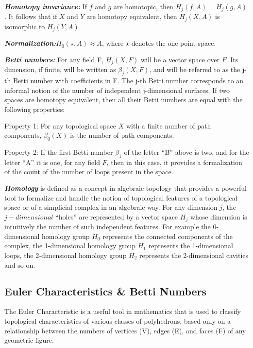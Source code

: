 \textbf{\textit{Homotopy invariance:}} If $f$ and $g$ are homotopic, then $H_j(f,A)=H_j(g,A)$. It follows that if $X$ and $Y$ are homotopy equivalent, then $H_j(X,A)$ is isomorphic to $H_j(Y,A)$.\cite{01.0_2010introductionTopoPropertiesInvariance} \cite{12.0_alatorre2018TDAinvariant}

\textbf{\textit{Normalization:}}$H_0(\star,A) \approx A$, where $\star$ denotes the one point space.

\textbf{\textit{Betti numbers:}} For any field F, $H_j(X, F)$ will be a vector space over $F$. Its dimension, if finite, will be written as $\beta_j(X, F)$, and will be referred to as the j-th Betti number with coefficients in F. The j-th Betti number corresponds to an informal notion of the number of independent j-dimensional surfaces. If two spaces are homotopy equivalent, then all their Betti numbers are equal with the following properties:

Property 1: For any topological space $X$ with a finite number of path components, $\beta_0(X)$ is the number of path components.

Property 2:  If the first Betti number $\beta_1$ of the letter “B” above is two, and for the letter “A” it is one, for any field $F$, then in this case, it provides a formalization of the count of the number of loops present in the space. \cite{07.2_TopoBettiNumbers} \cite{02_carlsson2009topology}

\textbf{\textit{Homology}}  is defined as a concept in algebraic topology that provides a  powerful tool to formalize and handle the notion of topological features of a topological space or of a simplicial complex in an algebraic way. For any dimension $j$, the $j-dimensional$ “holes” are represented by a vector space $H_j$ whose dimension is intuitively the number of such independent features. For example the 0-dimensional homology group $H_0$ represents the connected components of the complex, the 1-dimensional homology group $H_1$ represents the 1-dimensional loops, the 2-dimensional homology group $H_2$ represents the 2-dimensional cavities and so on.\cite{03.2_2008FindingHomology} \cite{03.3_de2007PersistentHomology} \cite{03.4_2008localizedHomology}


\subsection{Euler Characteristics \& Betti Numbers}

The Euler Characteristic is a useful tool in mathematics that is used to classify topological characteristics of various classes of polyhedrons, based only on a relationship between the numbers of vertices (V), edges (E), and faces (F) of any geometric figure.\cite{07.2_TopoBettiNumbers}

